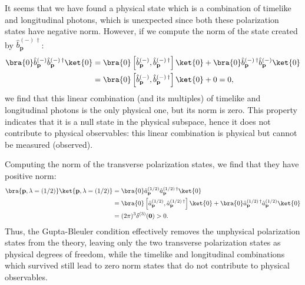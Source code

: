 It seems that we have found a physical state which is a combination of timelike and longitudinal photons, which is unexpected since both these polarization states have negative norm. However, if we compute the norm of the state created by \(\hat{b}^{(-)\,\dagger}_{\mathbf{p}}\):
\[
    \begin{aligned}
        \bra{0} \hat{b}^{(-)}_{\mathbf{p}} \hat{b}^{(-)\,\dagger}_{\mathbf{p}} \ket{0} & = \bra{0} \left[ \hat{b}^{(-)}_{\mathbf{p}}, \hat{b}^{(-)\,\dagger}_{\mathbf{p}} \right] \ket{0} + \bra{0} \hat{b}^{(-)\,\dagger}_{\mathbf{p}} \hat{b}^{(-)}_{\mathbf{p}} \ket{0} \\
                                                                                       & = \bra{0} \left[ \hat{b}^{(-)}_{\mathbf{p}}, \hat{b}^{(-)\,\dagger}_{\mathbf{p}} \right] \ket{0} + 0 = 0,
    \end{aligned}
\]
we find that this linear combination (and its multiples) of timelike and longitudinal photons is the only physical one, but its norm is zero. This property indicates that it is a null state in the physical subspace, hence it does not contribute to physical observables: this linear combination is physical but cannot be measured (observed).

Computing the norm of the transverse polarization states, we find that they have positive norm:
\[
    \begin{aligned}
        \bra{\mathbf{p}, \lambda=(1/2)} \ket{\mathbf{p}, \lambda=(1/2) } & = \bra{0} \hat{a}^{(1/2)}_{\mathbf{p}} \hat{a}^{(1/2)\,\dagger}_{\mathbf{p}} \ket{0}                                                                                                      \\
                                                                         & = \bra{0} \left[ \hat{a}^{(1/2)}_{\mathbf{p}}, \hat{a}^{(1/2)\,\dagger}_{\mathbf{p}} \right] \ket{0} + \bra{0} \hat{a}^{(1/2)\,\dagger}_{\mathbf{p}} \hat{a}^{(1/2)}_{\mathbf{p}} \ket{0} \\
                                                                         & = (2\pi)^3 \delta^{(3)}(\mathbf{0}) > 0.
    \end{aligned}
\]
Thus, the Gupta-Bleuler condition effectively removes the unphysical polarization states from the theory, leaving only the two transverse polarization states as physical degrees of freedom, while the timelike and longitudinal combinations which survived still lead to zero norm states that do not contribute to physical observables.

